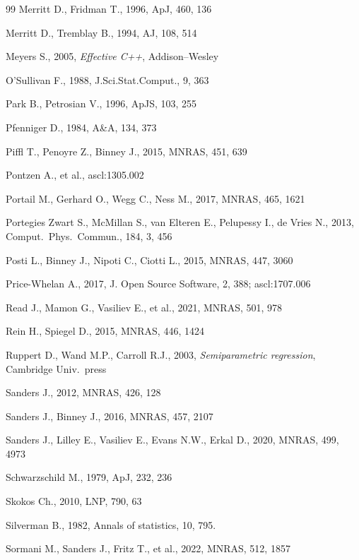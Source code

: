 \documentclass[12pt]{article}
\begin{document}
\begin{thebibliography}{99}
Merritt D., Fridman T., 1996, ApJ, 460, 136

Merritt D., Tremblay B., 1994, AJ, 108, 514

Meyers S., 2005, \textsl{Effective C++}, Addison--Wesley

O'Sullivan F., 1988, J.Sci.Stat.Comput., 9, 363

Park B., Petrosian V., 1996, ApJS, 103, 255

Pfenniger D., 1984, A\&A, 134, 373

Piffl T., Penoyre Z., Binney J., 2015, MNRAS, 451, 639

Pontzen A., et al., ascl:1305.002

Portail M., Gerhard O., Wegg C., Ness M., 2017, MNRAS, 465, 1621

Portegies Zwart S., McMillan S., van Elteren E., Pelupessy I., de Vries N., 2013, Comput.\ Phys.\ Commun., 184, 3, 456

Posti L., Binney J., Nipoti C., Ciotti L., 2015, MNRAS, 447, 3060

Price-Whelan A., 2017, J. Open Source Software, 2, 388; ascl:1707.006

Read J., Mamon G., Vasiliev E., et al., 2021, MNRAS, 501, 978

Rein H., Spiegel D., 2015, MNRAS, 446, 1424

Ruppert D., Wand M.P., Carroll R.J., 2003, \textsl{Semiparametric regression}, Cambridge Univ.\ press

Sanders J., 2012, MNRAS, 426, 128

Sanders J., Binney J., 2016, MNRAS, 457, 2107

Sanders J., Lilley E., Vasiliev E., Evans N.W., Erkal D., 2020, MNRAS, 499, 4973

Schwarzschild M., 1979, ApJ, 232, 236

Skokos Ch., 2010, LNP, 790, 63

Silverman B., 1982, Annals of statistics, 10, 795.

Sormani M., Sanders J., Fritz T., et al., 2022, MNRAS, 512, 1857


\end{thebibliography}
\end{document}
